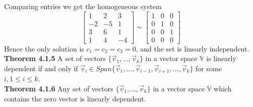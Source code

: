 \documentclass[10pt,letter]{article}
\begin{document}
Comparing entries we get the homogeneous system $$\begin{bmatrix}1&2&3\\-2&-5&1\\3&6&1\\1&4&-4\end{bmatrix}\sim\begin{bmatrix}1&0&0\\0&1&0\\0&0&1\\0&0&0\end{bmatrix}$$ Hence the only solution is $c_1=c_2=c_3=0$, and the set is linearly independent. \\ 
\textbf{Theorem 4.1.5} A set of vectors $\{\vec{v}_1,\ldots,\vec{v}_k\}$ in a vector space $\mathbb{V}$ is linearly dependent if and only if $\vec{v}_i\in Span\{\vec{v}_1,\ldots,\vec{v}_{i-1},\vec{v}_{i+1},\ldots,\vec{v}_k\}$ for some $i,1\leq i\leq k$. \\ 
\textbf{Theorem 4.1.6} Any set of vectors $\{\vec{v}_1,\ldots,\vec{v}_k\}$ in a vector space $\mathbb{V}$ which contains the zero vector is linearly dependent.
\end{document}
